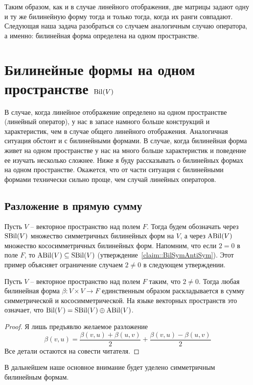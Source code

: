 Таким образом, как и в случае линейного отображения, две матрицы задают одну и ту же билинейную форму тогда и только тогда, когда их ранги совпадают. Следующая наша задача разобраться со случаем аналогичным случаю оператора, а именно: билинейная форма определена на одном пространстве.

\newpage
\section{Билинейные формы на одном пространстве $\operatorname{Bil}(V)$}

В случае, когда линейное отображение определено на одном пространстве (линейный оператор), у нас в запасе намного больше конструкций и характеристик, чем в случае общего линейного отображения. Аналогичная ситуация обстоит и с билинейными формами. В случае, когда билинейная форма живет на одном пространстве у нас на много больше характеристик и поведение ее изучать несколько сложнее. Ниже я буду рассказывать о билинейных формах на одном пространстве. Окажется, что от части ситуация с билинейными формами технически сильно проще, чем случай линейных операторов.

\subsection{Разложение в прямую сумму}

Пусть $V$ -- векторное пространство над полем $F$. Тогда будем обозначать через $\operatorname{SBil}(V)$ множество симметричных билинейных форм на $V$, а через $\operatorname{ABil}(V)$ множество кососимметричных билинейных форм. Напомним, что если $2 = 0$ в поле $F$, то $\operatorname{ABil}(V)\subseteq \operatorname{SBil}(V)$ (утверждение~\ref{claim::BilSymAntiSym}). Этот пример объясняет ограничение случаем $2 \neq 0$ в следующем утверждении.

\begin{claim}\label{claim::BilDirectSA}
Пусть $V$ -- векторное пространство над полем $F$ таким, что $2 \neq 0$. Тогда любая билинейная форма $\beta\colon V\times V\to F$ единственным образом раскладывается в сумму симметрической и кососимметрической. На языке векторных пространств это означает, что $\operatorname{Bil}(V) = \operatorname{SBil}(V) \oplus \operatorname{ABil}(V)$.
\end{claim}
\begin{proof}
Я лишь предъявлю желаемое разложение 
\[
\beta(v,u) = \frac{\beta(v,u) + \beta(u, v)}{2} + \frac{\beta(v,u) - \beta(u,v)}{2}
\]
Все детали остаются на совести читателя.
\end{proof}

В дальнейшем наше основное внимание будет уделено симметричным билинейным формам.